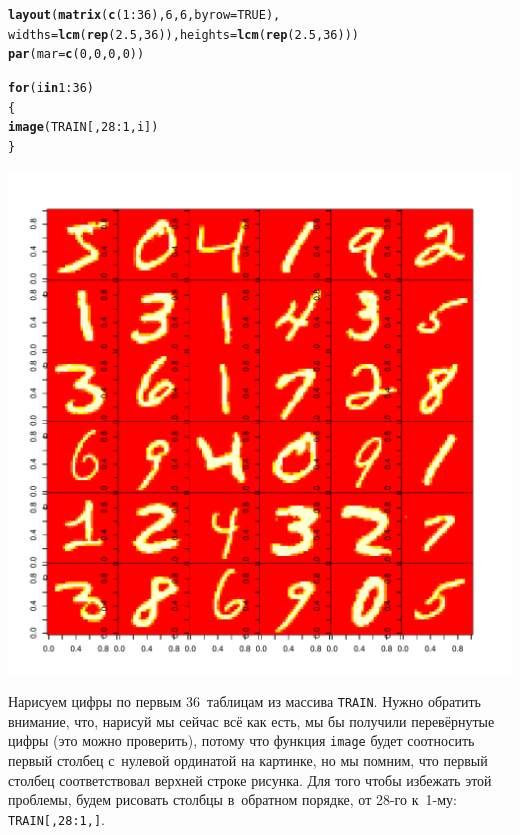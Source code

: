\documentclass[final,pdftex]{../../template/epsilonj}\usepackage[]{graphicx}\usepackage[]{color}
\makeatletter
\def\maxwidth{ %
  \ifdim\Gin@nat@width>\linewidth
    \linewidth
  \else
    \Gin@nat@width
  \fi
}
\newcommand{\hlnum}[1]{\textcolor[rgb]{0.686,0.059,0.569}{#1}}%
\newcommand{\hlopt}[1]{\textcolor[rgb]{0,0,0}{#1}}%
\newcommand{\hlstd}[1]{\textcolor[rgb]{0.345,0.345,0.345}{#1}}%
\newcommand{\hlkwa}[1]{\textcolor[rgb]{0.161,0.373,0.58}{\textbf{#1}}}%
\newcommand{\hlkwc}[1]{\textcolor[rgb]{0.333,0.667,0.333}{#1}}%
\newcommand{\hlkwd}[1]{\textcolor[rgb]{0.737,0.353,0.396}{\textbf{#1}}}%
\newenvironment{kframe}{%
 \def\at@end@of@kframe{}%
 \ifinner\ifhmode%
  \def\at@end@of@kframe{\end{minipage}}%
  \begin{minipage}{\columnwidth}%
 \fi\fi%
 \def\FrameCommand##1{\hskip\@totalleftmargin \hskip-\fboxsep
 \colorbox{shadecolor}{##1}\hskip-\fboxsep
     \hskip-\linewidth \hskip-\@totalleftmargin \hskip\columnwidth}%
 \MakeFramed {\advance\hsize-\width
   \@totalleftmargin\z@ \linewidth\hsize
   \@setminipage}}%
 {\par\unskip\endMakeFramed%
 \at@end@of@kframe}
\newenvironment{knitrout}{}{} %
\makeatother
\begin{document}
\begin{knitrout}
\color{fgcolor}\begin{kframe}
\begin{alltt}
\hlkwd{layout}\hlstd{(}\hlkwd{matrix}\hlstd{(}\hlkwd{c}\hlstd{(}\hlnum{1}\hlopt{:}\hlnum{36}\hlstd{),} \hlnum{6}\hlstd{,} \hlnum{6}\hlstd{,} \hlkwc{byrow} \hlstd{=} \hlnum{TRUE}\hlstd{),}
   \hlkwc{widths} \hlstd{=} \hlkwd{lcm}\hlstd{(}\hlkwd{rep}\hlstd{(}\hlnum{2.5}\hlstd{,}\hlnum{36}\hlstd{)),} \hlkwc{heights} \hlstd{=} \hlkwd{lcm}\hlstd{(}\hlkwd{rep}\hlstd{(}\hlnum{2.5}\hlstd{,}\hlnum{36}\hlstd{)))}
\hlkwd{par}\hlstd{(}\hlkwc{mar}\hlstd{=}\hlkwd{c}\hlstd{(}\hlnum{0}\hlstd{,}\hlnum{0}\hlstd{,}\hlnum{0}\hlstd{,}\hlnum{0}\hlstd{))}

\hlkwa{for}\hlstd{(i} \hlkwa{in} \hlnum{1}\hlopt{:}\hlnum{36}\hlstd{)}
  \hlstd{\{}
\hlkwd{image}\hlstd{(TRAIN[,}\hlnum{28}\hlopt{:}\hlnum{1}\hlstd{,i])}
  \hlstd{\}}
\end{alltt}
\end{kframe}
\includegraphics[width=\maxwidth]{figure/unnamed-chunk-4-1} 

\end{knitrout}

Нарисуем цифры по первым 36~таблицам из массива \texttt{TRAIN}. 
Нужно обратить внимание, что, нарисуй мы сейчас всё как есть, мы бы получили перевёрнутые цифры (это можно проверить), потому что функция \texttt{image} будет соотносить первый столбец с~нулевой ординатой на картинке, но мы помним, что первый столбец соответствовал верхней строке рисунка. 
Для того чтобы избежать этой проблемы, будем рисовать столбцы в~обратном порядке, от 28-го к~1-му: \texttt{TRAIN[,28:1,]}.
\end{document}
